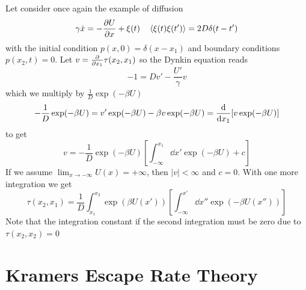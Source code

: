 \documentclass{notebook}
\begin{document}
Let consider once again the example of diffusion
%
\begin{equation}
\gamma \dot{x} = - \pdv{U}{x} + \xi(t) \quad \expval{\xi(t)\xi(t')} = 2D \delta(t-t')
\end{equation}
%
with the initial condition $p(x,0) = \delta(x-x_1)$ and boundary conditions $p(x_2,t) = 0$. Let $v = \pdv{x_1} \tau(x_2,x_1)$ so the Dynkin equation reads
%
\begin{equation}
-1 = D v' - \frac{U'}{\gamma}v
\end{equation}
%
which we multiply by $\frac{1}{D}\exp(-\beta U)$
%
\begin{equation}
-\frac{1}{D}\exp(-\beta U) = v'\exp(-\beta U) - \beta v \exp(-\beta U) = \dv{x_1}[v \exp(-\beta U)]
\end{equation}
%
to get
%
\begin{equation}
v = -\frac{1}{D}\exp(-\beta U) \left[ \int_{-\infty}^{x_1} \dd{x'} \exp(-\beta U) + c \right]
\end{equation}
%
If we assume $\lim_{x\to -\infty} U(x) = +\infty$, then $|v| < \infty$ and $c = 0$. With one more integration we get
%
\begin{equation}
\tau(x_2,x_1) = \frac{1}{D} \int_{x_1}^{x_2} \exp(\beta U(x')) \left[ \int_{-\infty}^{x'} \dd{x''} \exp(-\beta U(x'')) \right]
\end{equation}
%
Note that the integration constant if the second integration must be zero due to $\tau(x_2,x_2) = 0$

\section{Kramers Escape Rate Theory}
\end{document}
